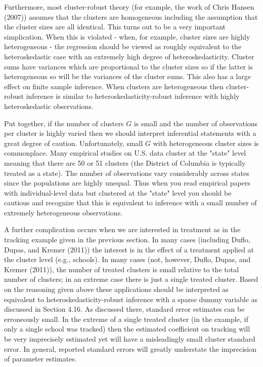 \documentclass[10pt]{article}
\begin{document}
Furthermore, most cluster-robust theory (for example, the work of Chris Hansen (2007)) assumes that the clusters are homogeneous including the assumption that the cluster sizes are all identical. This turns out to be a very important simplication. When this is violated - when, for example, cluster sizes are highly heterogeneous - the regression should be viewed as roughly equivalent to the heteroskedastic case with an extremely high degree of heteroskedasticity. Cluster sums have variances which are proportional to the cluster sizes so if the latter is heterogeneous so will be the variances of the cluster sums. This also has a large effect on finite sample inference. When clusters are heterogeneous then cluster-robust inference is similar to heteroskedasticity-robust inference with highly heteroskedastic observations.

Put together, if the number of clusters $G$ is small and the number of observations per cluster is highly varied then we should interpret inferential statements with a great degree of caution. Unfortunately, small $G$ with heterogeneous cluster sizes is commonplace. Many empirical studies on U.S. data cluster at the "state" level meaning that there are 50 or 51 clusters (the District of Columbia is typically treated as a state). The number of observations vary considerably across states since the populations are highly unequal. Thus when you read empirical papers with individual-level data but clustered at the "state" level you should be cautious and recognize that this is equivalent to inference with a small number of extremely heterogeneous observations.

A further complication occurs when we are interested in treatment as in the tracking example given in the previous section. In many cases (including Duflo, Dupas, and Kremer (2011)) the interest is in the effect of a treatment applied at the cluster level (e.g., schools). In many cases (not, however, Duflo, Dupas, and Kremer (2011)), the number of treated clusters is small relative to the total number of clusters; in an extreme case there is just a single treated cluster. Based on the reasoning given above these applications should be interpreted as equivalent to heteroskedasticity-robust inference with a sparse dummy variable as discussed in Section 4.16. As discussed there, standard error estimates can be erroneously small. In the extreme of a single treated cluster (in the example, if only a single school was tracked) then the estimated coefficient on tracking will be very imprecisely estimated yet will have a misleadingly small cluster standard error. In general, reported standard errors will greatly understate the imprecision of parameter estimates.
\end{document}
